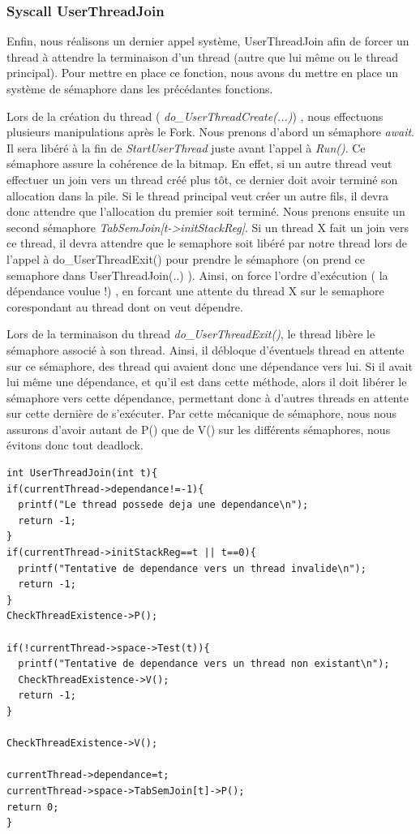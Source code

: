 \documentclass[a4paper,10pt]{article}
\begin{document}
\subsubsection{Syscall UserThreadJoin}
Enfin, nous réalisons un dernier appel système, UserThreadJoin afin de forcer un thread à attendre la terminaison d'un thread (autre que lui même ou le thread principal).
Pour mettre en place ce fonction, nous avons du mettre en place un système de sémaphore dans les précédantes fonctions.

Lors de la création du thread ( \textit{do\_UserThreadCreate(...)}) , nous effectuons plusieurs manipulations  après le Fork. Nous prenons d'abord un sémaphore \textit{await}.
Il sera libéré à la fin de \textit{StartUserThread} juste avant l'appel à \textit{Run()}. Ce sémaphore assure la cohérence de la bitmap. En effet, si un autre thread veut effectuer
un join vers un thread créé plus tôt, ce dernier doit avoir terminé son allocation dans la pile. Si le thread principal veut créer un autre fils, il devra donc attendre que 
l'allocation du premier soit terminé. Nous prenons ensuite un second sémaphore \textit{TabSemJoin[t->initStackReg]}.
Si un thread X fait un join vers ce thread, il devra attendre que le semaphore soit libéré par notre thread lors de l'appel à do\_UserThreadExit() pour prendre le sémaphore
(on prend ce semaphore dans UserThreadJoin(..) ). Ainsi, on force l'ordre d'exécution ( la dépendance voulue !) , en forcant une attente du thread X sur le semaphore 
corespondant au thread dont on veut dépendre.

Lors de la terminaison du thread \textit{do\_UserThreadExit()}, le thread libère le sémaphore associé à son thread.
Ainsi, il débloque d'éventuels thread en attente sur ce sémaphore, des thread qui avaient donc une dépendance vers lui.
Si il avait lui même une dépendance, et qu'il est dans cette méthode, alors il doit libérer le sémaphore vers cette dépendance,
permettant donc à d'autres threads en attente sur cette dernière de s'exécuter. Par cette mécanique de sémaphore, nous nous assurons d'avoir autant de P() que de V()
sur les différents sémaphores, nous évitons donc tout deadlock.
 
\begin{lstlisting}[frame=single]
 int UserThreadJoin(int t){
if(currentThread->dependance!=-1){
  printf("Le thread possede deja une dependance\n");
  return -1;
}
if(currentThread->initStackReg==t || t==0){
  printf("Tentative de dependance vers un thread invalide\n");
  return -1;
}
CheckThreadExistence->P();

if(!currentThread->space->Test(t)){
  printf("Tentative de dependance vers un thread non existant\n");
  CheckThreadExistence->V();
  return -1;
}

CheckThreadExistence->V();

currentThread->dependance=t;
currentThread->space->TabSemJoin[t]->P();
return 0;
}
\end{lstlisting}
\newpage
\end{document}
